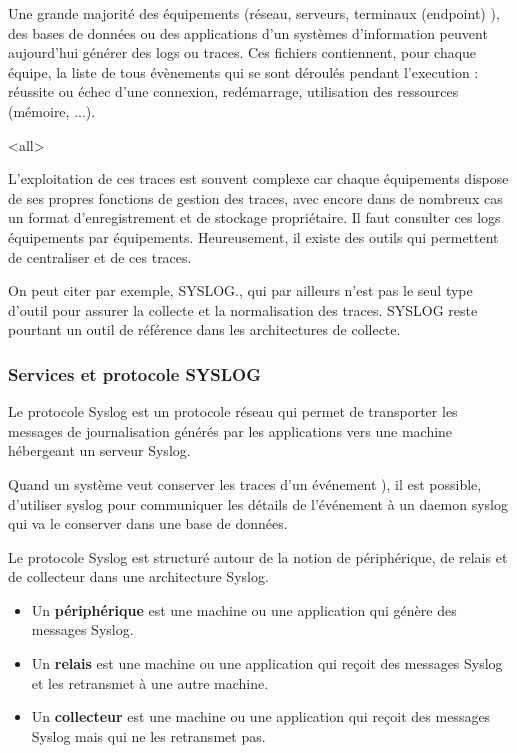 
Une grande majorité des équipements (réseau, serveurs, terminaux (endpoint) ), des bases de données ou des applications d’un systèmes d'information peuvent aujourd’hui générer des logs ou traces.  Ces fichiers contiennent, pour chaque équipe, la liste de tous évènements   qui se sont déroulés pendant l'execution : réussite ou échec d’une connexion, redémarrage, utilisation des ressources (mémoire, ...).


\mode<all>{}


L'exploitation de ces traces est souvent complexe car chaque équipements dispose de ses propres fonctions de gestion des traces, avec encore dans de nombreux cas un format  d'enregistrement et de stockage propriétaire. Il faut consulter ces logs équipements par équipements. Heureusement, il existe des outils qui permettent de centraliser et de  ces traces.

On peut citer par exemple, SYSLOG., qui par ailleurs n'est pas le seul type d'outil pour assurer la collecte et la normalisation des traces. SYSLOG reste pourtant un outil de référence dans les architectures de collecte.

\subsubsection{Services et protocole SYSLOG}

Le protocole Syslog est un protocole réseau qui permet de transporter les messages de journalisation générés par les applications vers une machine hébergeant un serveur Syslog. 

Quand un système veut conserver les traces d'un événement ),  il est possible, d'utiliser syslog pour communiquer les détails de l'événement à un daemon syslog qui va le conserver dans une base de données.

Le protocole Syslog est structuré autour de la notion de périphérique, de relais et de collecteur dans une architecture Syslog.

\begin{itemize}
  \item Un \textbf{périphérique} est une machine ou une application qui génère des messages Syslog.
  \item Un \textbf{relais} est une machine ou une application qui reçoit des messages Syslog et les retransmet à une autre machine.
  \item Un \textbf{collecteur} est une machine ou une application qui reçoit des messages Syslog mais qui ne les retransmet pas.
\end{itemize}

